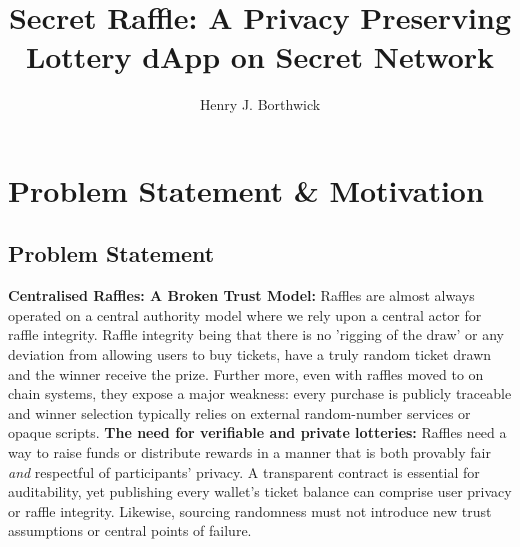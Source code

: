 \documentclass{article}
\title{Secret Raffle: A Privacy Preserving Lottery dApp on Secret Network}
\author{Henry J. Borthwick}
\begin{document}
\maketitle

\begin{abstract}
  
\end{abstract}

\section{Problem Statement \& Motivation}
\subsection{Problem Statement}
\textbf{Centralised Raffles: A Broken Trust Model:} Raffles are almost always operated on a central authority model where we rely upon a central actor for raffle integrity. Raffle integrity being that there is no 'rigging of the draw' or any deviation from allowing users to buy tickets, have a truly random ticket drawn and the winner receive the prize. Further more, even with raffles moved to on chain systems, they expose a major weakness: every purchase is publicly traceable and winner selection typically relies on external random-number services or opaque scripts. \textbf{The need for verifiable and private lotteries:} Raffles need a way to raise funds or distribute rewards in a manner that is both provably fair \emph{and} respectful of participants' privacy. A transparent contract is essential for auditability, yet publishing every wallet's ticket balance can comprise user privacy or raffle integrity. Likewise, sourcing randomness must not introduce new trust assumptions or central points of failure.
\end{document}

